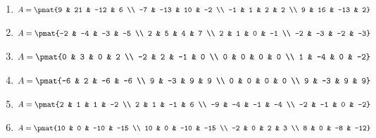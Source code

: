 \begin{enumerate}
\item

\begin{align*}
A = \pmat{9 & 21 & -12 & 6 \\ -7 & -13 & 10 & -2 \\ -1 & 1 & 2 & 2 \\ 9 & 16 & -13 & 2}
\end{align*}

\item

\begin{align*}
A = \pmat{-2 & -4 & -3 & -5 \\ 2 & 5 & 4 & 7 \\ 2 & 1 & 0 & -1 \\ -2 & -3 & -2 & -3}
\end{align*}

\item

\begin{align*}
A = \pmat{0 & 3 & 0 & 2 \\ -2 & 2 & -1 & 0 \\ 0 & 0 & 0 & 0 \\ 1 & -4 & 0 & -2}
\end{align*}

\item

\begin{align*}
A = \pmat{-6 & 2 & -6 & -6 \\ 9 & -3 & 9 & 9 \\ 0 & 0 & 0 & 0 \\ 9 & -3 & 9 & 9}
\end{align*}

\item

\begin{align*}
A = \pmat{2 & 1 & 1 & -2 \\ 2 & 1 & -1 & 6 \\ -9 & -4 & -1 & -4 \\ -2 & -1 & 0 & -2}
\end{align*}

\item

\begin{align*}
A = \pmat{10 & 0 & -10 & -15 \\ 10 & 0 & -10 & -15 \\ -2 & 0 & 2 & 3 \\ 8 & 0 & -8 & -12}
\end{align*}


\end{enumerate}
